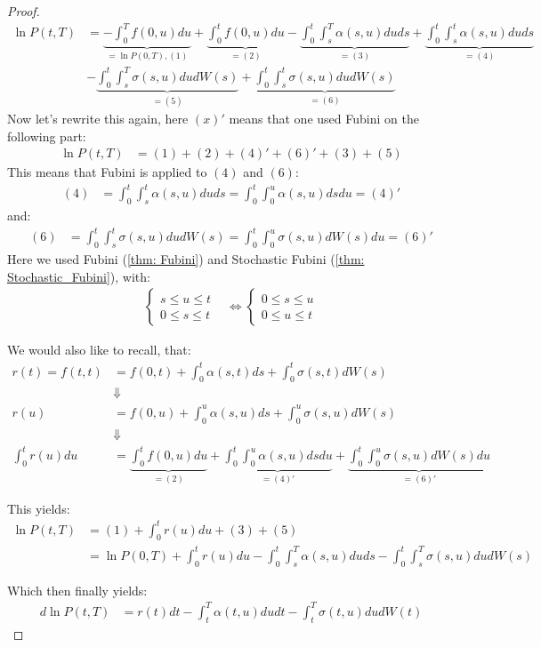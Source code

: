 \begin{proof}
\begin{align*}
\ln P(t,T) &=  
\underbrace{-\int_{0}^{T}f(0,u)du}_{= \ln P(0,T), (1)} 
+\underbrace{\int_{0}^{t}f(0,u)du}_{= (2)} 
- \underbrace{\int_{0}^{t}\int_{s}^{T}\alpha(s,u)duds}_{= (3)}
+ \underbrace{\int_{0}^{t}\int_{s}^{t}\alpha(s,u)duds}_{= (4)} \\ 
&- \underbrace{\int_{0}^{t}\int_{s}^{T}\sigma(s,u)dudW(s)}_{= (5)} 
+ \underbrace{\int_{0}^{t}\int_{s}^{t}\sigma(s,u)dudW(s)}_{= (6)}
\end{align*}
Now let's rewrite this again, here $(x)'$ means that one used Fubini on the following part: 
\begin{align*}
\ln P(t,T) &= (1) + (2) +(4)' + (6)' + (3) + (5)
\end{align*}
This means that Fubini is applied to $(4)$ and $(6)$: 
\begin{align*}
(4) &= \int_{0}^{t}\int_{s}^{t}\alpha(s,u)duds 
= \int_{0}^{t}\int_{0}^{u}\alpha(s,u)dsdu = (4)'
\end{align*}
and: 
\begin{align*}
(6) &= \int_{0}^{t}\int_{s}^{t}\sigma(s,u)dudW(s) = 
\int_{0}^{t}\int_{0}^{u}\sigma(s,u)dW(s)du = (6)'
\end{align*}
Here we used Fubini (\ref{thm: Fubini}) and Stochastic Fubini (\ref{thm: Stochastic_Fubini}), with:
\begin{align*}
\begin{cases}
 s \leq u \leq t \\ 
 0 \leq s \leq t
\end{cases}
&\iff
\begin{cases}
 0 \leq s \leq u \\ 
 0 \leq u \leq t
\end{cases}
\end{align*}

\newpage 
We would also like to recall, that: 
\begin{align*}
r(t) = f(t,t) 
&= f(0,t) + \int_{0}^{t}\alpha(s,t)ds + \int_{0}^{t}\sigma(s,t)dW(s) \\ 
&\Downarrow \\ 
r(u) &= f(0,u) + \int_{0}^{u}\alpha(s,u)ds + \int_{0}^{u}\sigma(s,u)dW(s) \\ 
&\Downarrow \\ 
\int_{0}^{t}r(u)du &= 
\underbrace{\int_{0}^{t}f(0,u)du}_{=(2)} 
+ \underbrace{\int_{0}^{t}\int_{0}^{u}\alpha(s,u)dsdu}_{= (4)'} 
+ \underbrace{\int_{0}^{t}\int_{0}^{u}\sigma(s,u)dW(s)du}_{= (6)'}
\end{align*}

This yields: 
\begin{align*}
\ln P(t,T) &= 
(1) + \int_{0}^{t}r(u)du + (3) + (5) \\ 
&= 
\ln P(0,T) + \int_{0}^{t}r(u)du 
-\int_{0}^{t}\int_{s}^{T}\alpha(s,u)duds 
-\int_{0}^{t}\int_{s}^{T}\sigma(s,u)dudW(s)
\end{align*}

Which then finally yields: 
\begin{align*}
d\ln P(t,T) &= 
r(t)dt - \int_{t}^{T}\alpha(t,u)dudt - \int_{t}^{T}\sigma(t,u)dudW(t)
\end{align*}     
\end{proof}

